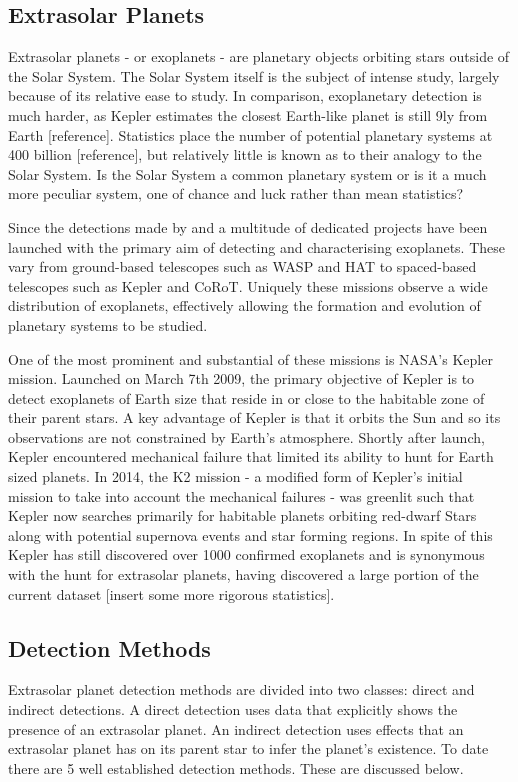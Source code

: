 \documentclass{report}
\begin{document}
\subsection{Extrasolar Planets}
Extrasolar planets - or exoplanets - are planetary objects orbiting stars outside of the Solar System. The Solar System itself is the subject of intense study, largely because of its relative ease to study. In comparison, exoplanetary detection is much harder, as Kepler estimates the closest Earth-like planet is still 9ly from Earth [reference].  Statistics place the number of potential planetary systems at 400 billion [reference], but relatively little is known as to their analogy to the Solar System. Is the Solar System a common planetary system or is it a much more peculiar system, one of chance and luck rather than mean statistics?  

Since the detections made by \citeauthor{first} and \citeauthor{MQ} a multitude of dedicated projects have been launched with the primary aim of detecting and characterising exoplanets. These vary from ground-based telescopes such as WASP and HAT to spaced-based telescopes such as Kepler and CoRoT. Uniquely these missions observe a wide distribution of exoplanets, effectively allowing the formation and evolution of planetary systems to be studied. 

One of the most prominent and substantial of these missions is NASA's Kepler mission. Launched on March 7th 2009, the primary objective of Kepler is to detect exoplanets of Earth size that reside in or close to the habitable zone of their parent stars. A key advantage of Kepler is that it orbits the Sun and so its observations are not constrained by Earth's atmosphere.  Shortly after launch, Kepler encountered mechanical failure that limited its ability to hunt for Earth sized planets. In 2014, the K2 mission - a modified form of Kepler's initial mission to take into account the mechanical failures - was greenlit such that Kepler now searches primarily for habitable planets orbiting red-dwarf Stars along with potential supernova events and star forming regions. In spite of this Kepler has still discovered over 1000 confirmed exoplanets and is synonymous with the hunt for extrasolar planets, having discovered a large portion of the current dataset [insert some more rigorous statistics].

\subsection{Detection Methods}
Extrasolar planet detection methods are divided into two classes: direct and indirect detections. A direct detection uses data that explicitly shows the presence of an extrasolar planet. An indirect detection uses effects that an extrasolar planet has on its parent star to infer the planet's existence. To date there are 5 well established detection methods. These are discussed below.  
\end{document}
